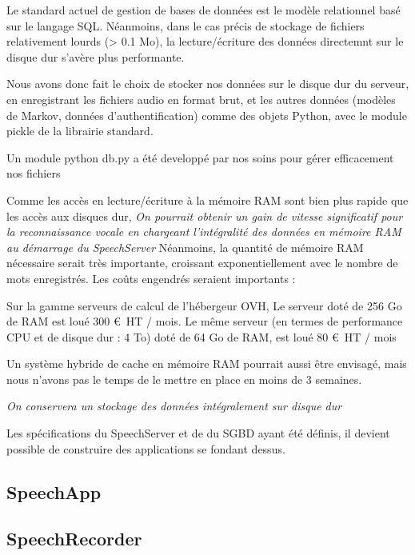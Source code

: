 \documentclass[a4paper,12pt]{report}
\begin{document}
\medskip{}

Le standard actuel de gestion de bases de données est le modèle relationnel basé sur le langage SQL. Néanmoins, dans le cas précis de stockage de fichiers relativement lourds (> 0.1 Mo), la lecture/écriture des données directemnt sur le disque dur s'avère plus performante.

\medskip{}

Nous avons donc fait le choix de stocker nos données sur le disque dur du serveur, en enregistrant les fichiers audio en format brut, et les autres données (modèles de Markov, données d'authentification) comme des objets Python, avec le module pickle de la librairie standard.

\smallskip{}

Un module python db.py a été developpé par nos soins pour gérer efficacement nos fichiers

\bigskip{}

Comme les accès en lecture/écriture à la mémoire RAM sont bien plus rapide que les accès aux disques dur,
\emph{On pourrait obtenir un gain de vitesse significatif pour la reconnaissance vocale en chargeant l'intégralité des données en mémoire RAM au démarrage du SpeechServer}
Néanmoins, la quantité de mémoire RAM nécessaire serait très importante, croissant exponentiellement avec le nombre de mots enregistrés. Les coûts engendrés seraient importants :

\medskip{}

Sur la gamme serveurs de calcul de l'hébergeur OVH,
Le serveur doté de 256 Go de RAM est loué 300 € HT / mois.
Le même serveur (en termes de performance CPU et de disque dur : 4 To) doté de 64 Go de RAM, est loué 80 € HT / mois

\medskip{}

Un système hybride de cache en mémoire RAM pourrait aussi être envisagé, mais nous n'avons pas le temps de le mettre en place en moins de 3 semaines.

\medskip{}

\emph{On conservera un stockage des données intégralement sur disque dur}

\medskip{}
Les spécifications du SpeechServer et de du SGBD ayant été définis, il devient possible de construire des applications se fondant dessus.

\subsection{SpeechApp}

\subsection{SpeechRecorder}
\end{document}
